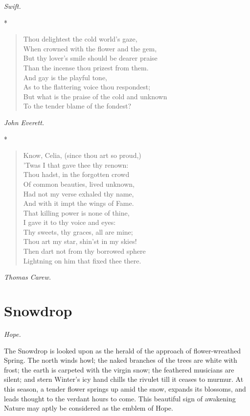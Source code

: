 \documentclass[11pt,twoside]{article}
\newcommand\flower[2]{\section*{#1}\addcontentsline{toc}{section}{#1}%
  \noindent\textit{#2.}\par\medskip}
\newcommand\stars{\begin{center}*\quad*\quad*\end{center}}
\newcommand\by[1]{\par\hfill\textit{#1}\par}
\begin{document}
\by{Swift.}

\stars

\begin{verse}
Thou delightest the cold world’s gaze,\\
\quad When crowned with the flower and the gem,\\
But thy lover’s smile should be dearer praise\\
\quad Than the incense thou prizest from them.\\
And gay is the playful tone,\\
\quad As to the flattering voice thou respondest;\\
But what is the praise of the cold and unknown\\
\quad To the tender blame of the fondest?
\end{verse}

\by{John Everett.}

\stars

\begin{verse}
Know, Celia, (since thou art so proud,)\\
\quad ’Twas I that gave thee thy renown:\\
Thou hadst, in the forgotten crowd\\
\quad Of common beauties, lived unknown,\\
Had not my verse exhaled thy name,\\
And with it impt the wings of Fame.\\
That killing power is none of thine,\\
\quad I gave it to thy voice and eyes:\\
Thy sweets, thy graces, all are mine;\\
\quad Thou art my star, shin’st in my skies!\\
Then dart not from thy borrowed sphere\\
Lightning on him that fixed thee there.
\end{verse}

\by{Thomas Carew.}

\flower{Snowdrop}{Hope}

The Snowdrop is looked upon as the herald of the approach of flower-wreathed Spring. The north winds howl; the naked branches of the trees are white with frost; the earth is carpeted with the virgin snow; the feathered musicians are silent; and stern Winter’s icy hand chills the rivulet till it ceases to murmur. At this season, a tender flower springs up amid the snow, expands its blossoms, and leads thought to the verdant hours to come. This beautiful sign of awakening Nature may aptly be considered as the emblem of Hope.
\end{document}
